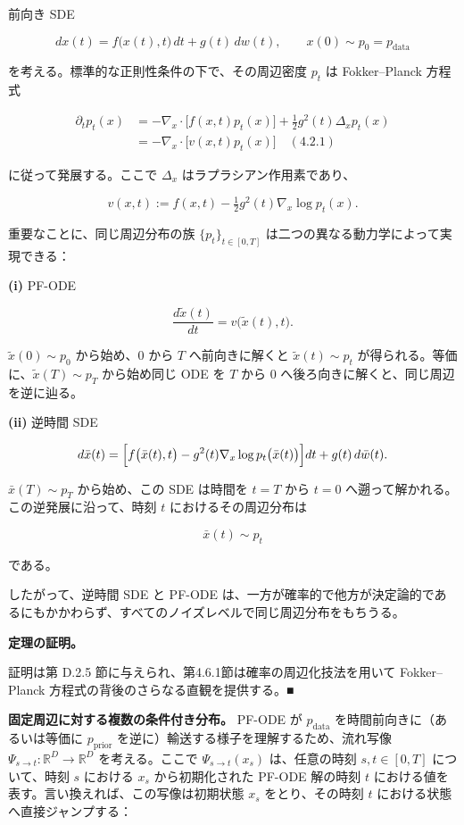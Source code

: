 \begin{propositionbox}
前向き SDE

\[
dx(t)=f\bigl(x(t),t\bigr)\,dt + g(t)\,dw(t), \qquad x(0)\sim p_0=p_{\mathrm{data}}
\]

を考える。標準的な正則性条件の下で、その周辺密度 $p_t$ は Fokker–Planck 方程式

\[
\begin{aligned}
\partial_t p_t(x)
&= -\nabla_x\cdot\bigl[f(x,t)p_t(x)\bigr] + \tfrac12 g^2(t)\Delta_x p_t(x) \\
&= -\nabla_x\cdot\bigl[v(x,t)p_t(x)\bigr] \quad (4.2.1)
\end{aligned}
\]

に従って発展する。ここで $\Delta_x$ はラプラシアン作用素であり、

\[
v(x,t):=f(x,t)-\tfrac12 g^2(t)\nabla_x\log p_t(x).
\]

重要なことに、同じ周辺分布の族 $\{p_t\}_{t\in[0,T]}$ は二つの異なる動力学によって実現できる：

\textbf{(i)} PF-ODE

\[
\frac{d\tilde{x}(t)}{dt}=v\bigl(\tilde{x}(t),t\bigr).
\]

$\tilde{x}(0)\sim p_0$ から始め、$0$ から $T$ へ前向きに解くと $\tilde{x}(t)\sim p_t$ が得られる。等価に、$\tilde{x}(T)\sim p_T$ から始め同じ ODE を $T$ から $0$ へ後ろ向きに解くと、同じ周辺を逆に辿る。

\textbf{(ii)} 逆時間 SDE

\[
d\bar{x}(t)=\Bigl[f\bigl(\bar{x}(t),t\bigr)-g^2(t)\nabla_x\log p_t\bigl(\bar{x}(t)\bigr)\Bigr]dt + g(t)\,d\bar{w}(t).
\]

$\bar{x}(T)\sim p_T$ から始め、この SDE は時間を $t=T$ から $t=0$ へ遡って解かれる。この逆発展に沿って、時刻 $t$ におけるその周辺分布は

\[
\bar{x}(t)\sim p_t
\]

である。

したがって、逆時間 SDE と PF-ODE は、一方が確率的で他方が決定論的であるにもかかわらず、すべてのノイズレベルで同じ周辺分布をもちうる。
\end{propositionbox}


\textbf{定理の証明。}

証明は第 D.2.5 節に与えられ、第4.6.1節は確率の周辺化技法を用いて Fokker–Planck 方程式の背後のさらなる直観を提供する。■

\textbf{固定周辺に対する複数の条件付き分布。} PF-ODE が $p_{\mathrm{data}}$ を時間前向きに（あるいは等価に $p_{\mathrm{prior}}$ を逆に）輸送する様子を理解するため、流れ写像 $\Psi_{s\to t}:\mathbb{R}^D\to\mathbb{R}^D$ を考える。ここで $\Psi_{s\to t}(x_s)$ は、任意の時刻 $s,t\in[0,T]$ について、時刻 $s$ における $x_s$ から初期化された PF-ODE 解の時刻 $t$ における値を表す。言い換えれば、この写像は初期状態 $x_s$ をとり、その時刻 $t$ における状態へ直接ジャンプする：

